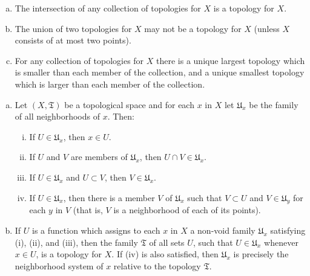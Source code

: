 \begin{problem}\label{problem:largest-and-smallest-topologies}
  \leavevmode\vspace{-\baselineskip}
  \begin{enumerate}[(a)]
    \item
      The intersection of any collection of topologies for \(X\) is a topology for \(X\).
    \item
      The union of two topologies for \(X\) may not be a topology for \(X\) (unless \(X\) consists of at most two points).
    \item
      For any collection of topologies for \(X\) there is a unique largest topology which is smaller than each member of the collection, and a unique smallest topology which is larger than each member of the collection.
  \end{enumerate}
\end{problem}

\begin{problem}\label{problem:topologies-from-neighborhood-systems}
  \leavevmode\vspace{-\baselineskip}
  \begin{enumerate}[(a)]
    \item
      Let \((X,\mathfrak{T})\) be a topological space and for each \(x\) in \(X\) let \(\mathfrak{U}_{x}\) be the family of all neighborhoods of \(x\). Then:
      \begin{enumerate}[(i)]
        \item
          If \({U}\in{\mathfrak{U}_{x}}\), then \({x}\in{U}\).
        \item
          If \(U\) and \(V\) are members of \(\mathfrak{U}_{x}\), then \({{U}\cap{V}}\in{\mathfrak{U}_{x}}\).
        \item
          If \({U}\in{\mathfrak{U}_{x}}\) and \({U}\subset{V}\), then \({V}\in{\mathfrak{U}_{x}}\).
        \item
          If \({U}\in{\mathfrak{U}_{x}}\), then there is a member \(V\) of \(\mathfrak{U}_{x}\) such that \({V}\subset{U}\) and \({V}\in{\mathfrak{U}_{y}}\) for each \(y\) in \(V\) (that is, \(V\) is a neighborhood of each of its points).
      \end{enumerate}
    \item
      If \(U\) is a function which assigns to each \(x\) in \(X\) a non-void family \(\mathfrak{U}_{x}\) satisfying (i), (ii), and (iii), then the family \(\mathfrak{T}\) of all sets \(U\), such that \({U}\in{\mathfrak{U}_{x}}\) whenever \({x}\in{U}\), is a topology for \(X\). If (iv) is also satisfied, then \(\mathfrak{U}_{x}\) is precisely the neighborhood system of \(x\) relative to the topology \(\mathfrak{T}\).
  \end{enumerate}
\end{problem}
